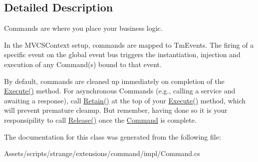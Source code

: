\subsection{Detailed Description}
Commands are where you place your business logic. 

In the M\-V\-C\-S\-Context setup, commands are mapped to Tm\-Events. The firing of a specific event on the global event bus triggers the instantiation, injection and execution of any Command(s) bound to that event.

By default, commands are cleaned up immediately on completion of the {\ttfamily \hyperlink{classstrange_1_1extensions_1_1command_1_1impl_1_1_command_a4a1155270428842c342482c6885b2652}{Execute()}} method. For asynchronous Commands (e.\-g., calling a service and awaiting a response), call {\ttfamily \hyperlink{classstrange_1_1extensions_1_1command_1_1impl_1_1_command_a1525def9650d4b6ed6ed6cef2936d892}{Retain()}} at the top of your {\ttfamily \hyperlink{classstrange_1_1extensions_1_1command_1_1impl_1_1_command_a4a1155270428842c342482c6885b2652}{Execute()}} method, which will prevent premature cleanup. But remember, having done so it is your responsipility to call {\ttfamily \hyperlink{classstrange_1_1extensions_1_1command_1_1impl_1_1_command_a783b532e62f1c5c7789ae1a5791c75c7}{Release()}} once the \hyperlink{classstrange_1_1extensions_1_1command_1_1impl_1_1_command}{Command} is complete. 

The documentation for this class was generated from the following file\-:\begin{DoxyCompactItemize}
\item 
Assets/scripts/strange/extensions/command/impl/Command.\-cs\end{DoxyCompactItemize}
